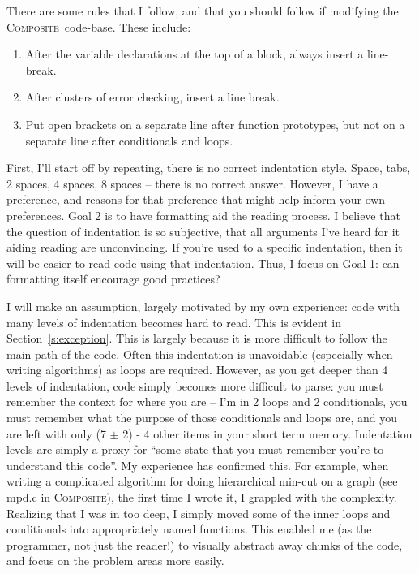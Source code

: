 \documentclass[11pt,onecolumn]{article}
\def\composite{\textsc{Composite}}
\newcommand{\head}[1]{\vspace{0.4em}\noindent{\bf #1}}
\begin{document}
\head{\composite\ conventions.} There are some rules that I follow,
and that you should follow if modifying the \composite\ code-base.
These include:
\begin{enumerate}[itemsep=0pt,topsep=1pt,parsep=1pt,leftmargin=2.5em]
\item After the variable declarations at the top of a block, always
  insert a line-break.
\item After clusters of error checking, insert a line break.
\item Put open brackets on a separate line after function prototypes,
  but not on a separate line after conditionals and loops.
\end{enumerate}

\head{Indentation.}  First, I'll start off by repeating, there is no
correct indentation style.  Space, tabs, 2 spaces, 4 spaces, 8 spaces
-- there is no correct answer.  However, I have a preference, and
reasons for that preference that might help inform your own
preferences.  Goal 2 is to have formatting aid the reading process.  I
believe that the question of indentation is so subjective, that all
arguments I've heard for it aiding reading are unconvincing.  If
you're used to a specific indentation, then it will be easier to read
code using that indentation.  Thus, I focus on Goal 1: can formatting
itself encourage good practices?

I will make an assumption, largely motivated by my own experience:
code with many levels of indentation becomes hard to read.  This is
evident in Section~\ref{s:exception}.  This is largely because it is
more difficult to follow the main path of the code.  Often this
indentation is unavoidable (especially when writing algorithms) as
loops are required.  However, as you get deeper than 4 levels of
indentation, code simply becomes more difficult to parse: you must
remember the context for where you are -- I'm in 2 loops and 2
conditionals, you must remember what the purpose of those conditionals
and loops are, and you are left with only (7 $\pm$ 2) - 4 other items
in your short term memory.  Indentation levels are simply a proxy for
``some state that you must remember you're to understand this code''.
My experience has confirmed this.  For example, when writing a
complicated algorithm for doing hierarchical min-cut on a graph (see
mpd.c in \composite ), the first time I wrote it, I grappled with the
complexity.  Realizing that I was in too deep, I simply moved some of
the inner loops and conditionals into appropriately named functions.
This enabled me (as the programmer, not just the reader!) to visually
abstract away chunks of the code, and focus on the problem areas more
easily.
\end{document}
